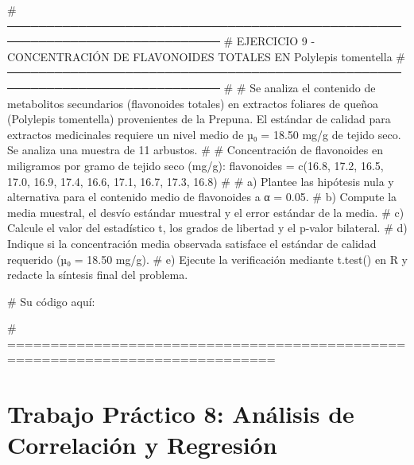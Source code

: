 \documentclass[
  spanish,
  letterpaper,
  DIV=11,
  numbers=noendperiod]{scrreprt}
\newenvironment{Shaded}{\begin{snugshade}}{\end{snugshade}}
\newcommand{\CommentTok}[1]{\textcolor[rgb]{0.37,0.37,0.37}{#1}}
\newcommand{\FloatTok}[1]{\textcolor[rgb]{0.68,0.00,0.00}{#1}}
\newcommand{\FunctionTok}[1]{\textcolor[rgb]{0.28,0.35,0.67}{#1}}
\newcommand{\NormalTok}[1]{\textcolor[rgb]{0.00,0.23,0.31}{#1}}
\newcommand{\OtherTok}[1]{\textcolor[rgb]{0.00,0.23,0.31}{#1}}
\begin{document}
\begin{Shaded}
\begin{Highlighting}[]
\CommentTok{\# ─────────────────────────────────────────────────────────────────────────────}
\CommentTok{\# EJERCICIO 9 {-} CONCENTRACIÓN DE FLAVONOIDES TOTALES EN Polylepis tomentella}
\CommentTok{\# ─────────────────────────────────────────────────────────────────────────────}
\CommentTok{\#}
\CommentTok{\# Se analiza el contenido de metabolitos secundarios (flavonoides totales) en extractos foliares de queñoa (Polylepis tomentella) provenientes de la Prepuna. El estándar de calidad para extractos medicinales requiere un nivel medio de µ₀ = 18.50 mg/g de tejido seco. Se analiza una muestra de 11 arbustos.}
\CommentTok{\#}
\CommentTok{\# Concentración de flavonoides en miligramos por gramo de tejido seco (mg/g):}
\NormalTok{flavonoides }\OtherTok{=} \FunctionTok{c}\NormalTok{(}\FloatTok{16.8}\NormalTok{, }\FloatTok{17.2}\NormalTok{, }\FloatTok{16.5}\NormalTok{, }\FloatTok{17.0}\NormalTok{, }\FloatTok{16.9}\NormalTok{, }\FloatTok{17.4}\NormalTok{, }\FloatTok{16.6}\NormalTok{, }\FloatTok{17.1}\NormalTok{, }\FloatTok{16.7}\NormalTok{, }\FloatTok{17.3}\NormalTok{, }\FloatTok{16.8}\NormalTok{)}
\CommentTok{\#}
\CommentTok{\# a) Plantee las hipótesis nula y alternativa para el contenido medio de flavonoides a α = 0.05.}
\CommentTok{\# b) Compute la media muestral, el desvío estándar muestral y el error estándar de la media.}
\CommentTok{\# c) Calcule el valor del estadístico t, los grados de libertad y el p{-}valor bilateral.}
\CommentTok{\# d) Indique si la concentración media observada satisface el estándar de calidad requerido (µ₀ = 18.50 mg/g).}
\CommentTok{\# e) Ejecute la verificación mediante t.test() en R y redacte la síntesis final del problema.}

\CommentTok{\# Su código aquí:}

\CommentTok{\# =============================================================================}
\end{Highlighting}
\end{Shaded}


\chapter{Trabajo Práctico 8: Análisis de Correlación y
Regresión}\label{trabajo-pruxe1ctico-8-anuxe1lisis-de-correlaciuxf3n-y-regresiuxf3n}
\end{document}
